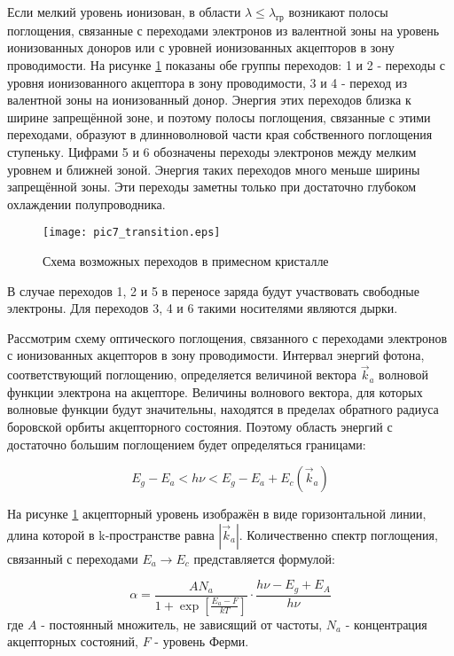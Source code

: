 Если мелкий уровень ионизован, в области $\lambda \le \lambda_{\text{гр}}$ возникают полосы поглощения, связанные с переходами электронов из валентной зоны на уровень ионизованных доноров или с уровней ионизованных акцепторов в зону проводимости. На рисунке \ref{pic7_transition} показаны обе группы переходов: 1 и 2 - переходы с уровня ионизованного акцептора в зону проводимости, 3 и 4 - переход из валентной зоны на ионизованный донор. Энергия этих переходов близка к ширине запрещённой зоне, и поэтому полосы поглощения, связанные с этими переходами, образуют в длинноволновой части края собственного поглощения ступеньку. Цифрами 5 и 6 обозначены переходы электронов между мелким уровнем и ближней зоной. Энергия таких переходов много меньше ширины запрещённой зоны. Эти переходы заметны только при достаточно глубоком охлаждении полупроводника.

\begin{figure}[h!]\centering
\texttt{[image: pic7\_transition.eps]}
\caption{Схема возможных переходов в примесном кристалле}
\label{pic7_transition}
\end{figure}

В случае переходов 1, 2 и 5 в переносе заряда будут участвовать свободные электроны. Для переходов 3, 4 и 6 такими носителями являются дырки.

Рассмотрим схему оптического поглощения, связанного с переходами электронов с ионизованных акцепторов в зону проводимости. Интервал энергий фотона, соответствующий поглощению, определяется величиной вектора $\overrightarrow{k}_{a}$ волновой функции электрона на акцепторе. Величины волнового вектора, для которых волновые функции будут значительны, находятся в пределах обратного радиуса боровской орбиты акцепторного состояния. Поэтому область энергий с достаточно большим поглощением будет определяться границами:

\begin{equation}
E_{g} - E_{a} < h \nu < E_{g} - E_{a} + E_{c}(\overrightarrow{k}_{a})
\end{equation}

На рисунке \ref{pic7_transition} акцепторный уровень изображён в виде горизонтальной линии, длина которой в k-пространстве равна $|\overrightarrow{k}_{a}|$. Количественно спектр поглощения, связанный с переходами $E_{a} \rightarrow E_{c}$ представляется формулой:

\begin{equation}
\alpha = \frac{A N_{a}}{1+\exp \left[ \frac{E_{a} - F}{k T} \right]} \cdot \frac{h \nu - E_{g} + E_{A}}{h \nu}
\end{equation}
где $A$ - постоянный множитель, не зависящий от частоты, $N_{a}$ - концентрация акцепторных состояний, $F$ - уровень Ферми.

